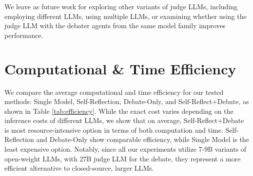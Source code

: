 \documentclass[11pt]{article}
\begin{document}
We leave as future work for exploring other variants of judge LLMs, including employing different LLMs, using multiple LLMs, or examining whether using the judge LLM with the debater agents from the same model family improves performance.












\section{Computational \& Time Efficiency}
\label{appendix:efficiency}
We compare the average computational and time efficiency for our tested methods: Single Model, Self-Reflection, Debate-Only, and Self-Reflect+Debate, as shown in Table \ref{tab:efficiency}. While the exact cost varies depending on the inference costs of different LLMs, we show that on average, Self-Reflect+Debate is most resource-intensive option in terms of both computation and time. Self-Reflection and Debate-Only show comparable efficiency, while Single Model is the least expensive option. Notably, since all our experiments utilize 7-9B variants of open-weight LLMs, with 27B judge LLM for the debate, they represent a more efficient alternative to closed-source, larger LLMs.
\end{document}
